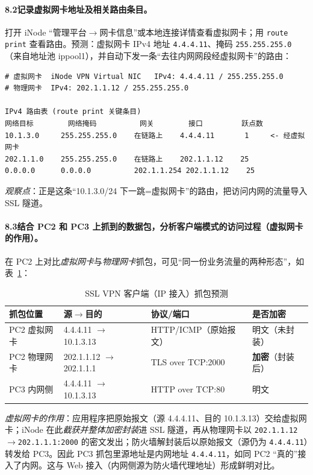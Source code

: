 \documentclass[12pt,a4paper]{article}
\begin{document}
\paragraph{8.2\quad 记录虚拟网卡地址及相关路由条目。}
打开 iNode “管理平台$\to$网卡信息”或本地连接详情查看虚拟网卡；用 \texttt{route print} 查看路由。预测：虚拟网卡 IPv4 地址 \texttt{4.4.4.11}、掩码 \texttt{255.255.255.0}（来自地址池 ippool1），并自动下发一条“去往内网网段经虚拟网卡”的路由：
\begin{lstlisting}[basicstyle=\ttfamily\scriptsize]
# 虚拟网卡  iNode VPN Virtual NIC   IPv4: 4.4.4.11 / 255.255.255.0
# 物理网卡  IPv4: 202.1.1.12 / 255.255.255.0

IPv4 路由表 (route print 关键条目)
网络目标        网络掩码          网关        接口         跃点数
10.1.3.0     255.255.255.0    在链路上    4.4.4.11       1     <- 经虚拟网卡
202.1.1.0    255.255.255.0    在链路上    202.1.1.12    25
0.0.0.0      0.0.0.0          202.1.1.254 202.1.1.12    25
\end{lstlisting}
\emph{观察点}：正是这条“10.1.3.0/24 下一跳=虚拟网卡”的路由，把访问内网的流量导入 SSL 隧道。

\paragraph{8.3\quad 结合 PC2 和 PC3 上抓到的数据包，分析客户端模式的访问过程（虚拟网卡的作用）。}
在 PC2 上对比\emph{虚拟网卡}与\emph{物理网卡}抓包，可见“同一份业务流量的两种形态”，如表~\ref{tab:ipvpn}：
\begin{table}[H]
\centering\caption{SSL VPN 客户端（IP 接入）抓包预测}\label{tab:ipvpn}
\small
\begin{tabular}{@{}p{3.4cm}p{3.4cm}p{3.4cm}p{2.2cm}@{}}
\toprule
抓包位置 & 源$\to$目的 & 协议/端口 & 是否加密 \\
\midrule
PC2 虚拟网卡 & 4.4.4.11 $\to$ 10.1.3.13 & HTTP/ICMP（原始报文） & 明文（未封装） \\
PC2 物理网卡 & 202.1.1.12 $\to$ 202.1.1.1 & TLS over TCP:2000 & \textbf{加密}（封装后） \\
PC3 内网侧 & 4.4.4.11 $\to$ 10.1.3.13 & HTTP over TCP:80 & 明文 \\
\bottomrule
\end{tabular}
\end{table}
\emph{虚拟网卡的作用}：应用程序把原始报文（源 4.4.4.11、目的 10.1.3.13）交给虚拟网卡；iNode 在此\emph{截获并整体加密封装}进 SSL 隧道，再从物理网卡以 \texttt{202.1.1.12$\to$202.1.1.1:2000} 的密文发出；防火墙解封装后以原始报文（源仍为 \texttt{4.4.4.11}）转发给 PC3。因此 PC3 抓包里源地址是内网地址 \texttt{4.4.4.11}，如同 PC2 “真的”接入了内网。这与 Web 接入（内网侧源为防火墙代理地址）形成鲜明对比。
\end{document}
